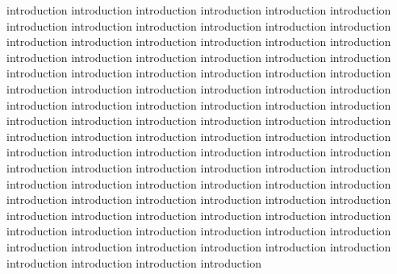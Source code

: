\documentclass[platex,ja=standard,12pt,a4paper,twoside,onecolumn,fleqn,dvipdfmx,english]{bxjsbook}
\begin{document}
introduction introduction introduction introduction introduction introduction introduction introduction introduction introduction introduction introduction introduction introduction introduction introduction introduction introduction introduction introduction introduction introduction introduction introduction introduction introduction introduction introduction introduction introduction introduction introduction introduction introduction introduction introduction introduction introduction introduction introduction introduction introduction introduction introduction introduction introduction introduction introduction introduction introduction introduction introduction introduction introduction introduction introduction introduction introduction introduction introduction introduction introduction introduction introduction introduction introduction introduction introduction introduction introduction introduction introduction introduction introduction introduction introduction introduction introduction introduction introduction introduction introduction introduction introduction introduction introduction introduction introduction introduction introduction introduction introduction introduction introduction introduction introduction introduction introduction introduction introduction
\end{document}
